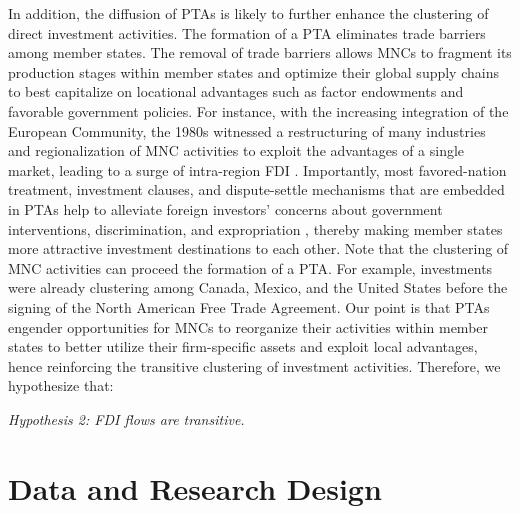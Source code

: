 \documentclass[reqno,onecolumn,letterpaper,12pt]{article}
\begin{document}
In addition, the diffusion of PTAs is likely to further enhance the clustering of direct investment activities. The formation of a PTA eliminates trade barriers among member states. The removal of trade barriers allows MNCs to fragment its production stages within member states and optimize their global supply chains to best capitalize on locational advantages such as factor endowments and favorable government policies. For instance, with the increasing integration of the European Community, the 1980s witnessed a restructuring of many industries and regionalization of MNC activities to exploit the advantages of a single market, leading to a surge of intra-region FDI \citep[34]{UNCTAD:1991}. Importantly, most favored-nation treatment, investment clauses, and dispute-settle mechanisms that are embedded in PTAs help to alleviate foreign investors' concerns about government interventions, discrimination, and expropriation \citep{Buthe_Milner:2008,buthe2014foreign}, thereby making member states more attractive investment destinations to each other. Note that the clustering of MNC activities can proceed the formation of a PTA. For example, investments were already clustering among Canada, Mexico, and the United States before the signing of the North American Free Trade Agreement. Our point is that PTAs engender opportunities for MNCs to reorganize their activities within member states to better utilize their firm-specific assets and exploit local advantages, hence reinforcing the transitive clustering of investment activities. Therefore, we hypothesize that:

\begin{center}
\textit{Hypothesis 2: FDI flows are transitive.}
\end{center}




\section{Data and Research Design}

\end{document}
